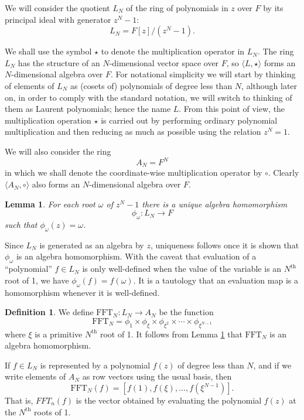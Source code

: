 \documentclass[12pt, letter, oneside]{amsart}
\theoremstyle{definition}
\newtheorem{definition}[para]{Definition}
\theoremstyle{plain}
\newtheorem{lemma}[para]{Lemma}
\numberwithin{equation}{para}
\numberwithin{figure}{section}
\newcommand{\FFT}{\text{FFT}}
\renewcommand{\th}{\text{th}}
\begin{document}
We will consider the quotient $L_N$ of the ring of polynomials in $z$
over $F$ by its principal ideal with generator $z^N - 1$:
$$L_N = F[z]/(z^N-1).$$

We shall use the symbol $\star$ to denote the multiplication operator
in $L_N$.  The ring $L_N$ has the structure of an $N$-dimensional
vector space over $F$, so $\langle L, \star\rangle$ forms an
$N$-dimensional algebra over $F$.  For notational simplicity we will
start by thinking of elements of $L_N$ as (cosets of) polynomials of
degree less than $N$, although later on, in order to comply with the
standard notation, we will switch to thinking of them as Laurent
polynomials; hence the name $L$.  From this point of view, the
multiplication operation $\star$ is carried out by performing ordinary
polynomial multiplication and then reducing as much as possible using
the relation $z^N = 1$.

We will also consider the ring $$A_N = F^N$$ in which we shall denote
the coordinate-wise multiplication operator by $\circ$.  Clearly
$\langle A_N, \circ\rangle$ also forms an $N$-dimensional algebra over
$F$.

\begin{lemma}\label{lemma:evaluation}
For each root $\omega$ of $z^N - 1$ there is a unique algebra
homomorphism
$$\phi_\omega:L_N \to F$$
such that $\phi_\omega(z) = \omega$.
\end{lemma}
\proof Since $L_N$ is generated as an algebra by $z$, uniqueness
follows once it is shown that $\phi_\omega$ is an algebra
homomorphism.  With the caveat that evaluation of a ``polynomial''
$f\in L_N$ is only well-defined when the value of the variable is an
$N^\th$ root of 1, we have $\phi_\omega(f) = f(\omega)$.  It is a
tautology that an evaluation map is a homomorphism whenever it is
well-defined.
\endproof

\begin{definition}\label{definition:fft}
We define $\FFT_N:L_N \to A_N$ be the function
$$\FFT_N = \phi_1 \times \phi_\xi \times \phi_{\xi^2} \times \cdots
\times \phi_{\xi^{N-1}}$$
where $\xi$ is a primitive $N^\th$ root of 1.  It follows from
Lemma \ref{lemma:evaluation} that $\FFT_N$ is an algebra homomorphism.
\end{definition}

If $f\in L_N$ is represented by a polynomial $f(z)$ of
degree less than $N$, and if we write elements of $A_N$ as row vectors
using the usual basis, then
$$\FFT_N(f) = [ f(1), f(\xi), \ldots, f(\xi^{N-1}) ].$$
That is, $FFT_n(f)$ is the vector obtained by evaluating the polynomial $f(z)$
at the $N^\th$ roots of 1.
\end{document}
